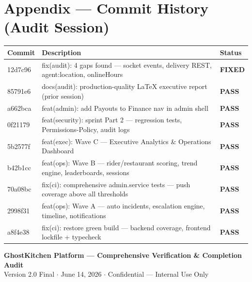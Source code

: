 \documentclass[11pt,a4paper]{article}
\newcommand{\PASS}{\colorbox{successgreen!20}{\color{successgreen}\bfseries\small PASS}}
\newcommand{\FIXED}{\colorbox{successgreen!20}{\color{successgreen}\bfseries\small FIXED}}
\begin{document}
\section*{Appendix — Commit History (Audit Session)}

\begin{tabularx}{\textwidth}{@{}p{2.3cm}Xp{2cm}@{}}
\toprule
\rowcolor{navyblue}\color{white}\bfseries Commit & \color{white}\bfseries Description & \color{white}\bfseries Status \\
\midrule
12d7c96 & fix(audit): 4 gaps found — socket events, delivery REST, agent:location, onlineHours & \FIXED \\
\rowcolor{rowalt}
85791e6 & docs(audit): production-quality LaTeX executive report (prior session) & \PASS \\
a662bca & feat(admin): add Payouts to Finance nav in admin shell & \PASS \\
\rowcolor{rowalt}
0f21179 & feat(security): sprint Part 2 — regression tests, Permissions-Policy, audit logs & \PASS \\
5b2577f & feat(exec): Wave C — Executive Analytics \& Operations Dashboard & \PASS \\
\rowcolor{rowalt}
b42b1cc & feat(ops): Wave B — rider/restaurant scoring, trend engine, leaderboards, sessions & \PASS \\
70a08bc & fix(ci): comprehensive admin.service tests — push coverage above all thresholds & \PASS \\
\rowcolor{rowalt}
2998f31 & feat(ops): Wave A — auto incidents, escalation engine, timeline, notifications & \PASS \\
a8f4e38 & fix(ci): restore green build — backend coverage, frontend lockfile + typecheck & \PASS \\
\bottomrule
\end{tabularx}

\vspace{16pt}

\begin{center}
\vspace{8pt}

{\color{navyblue}\small\bfseries GhostKitchen Platform — Comprehensive Verification \& Completion Audit}\\
{\color{midgray}\small Version 2.0 Final $\cdot$ June 14, 2026 $\cdot$ Confidential — Internal Use Only}
\end{center}
\end{document}
